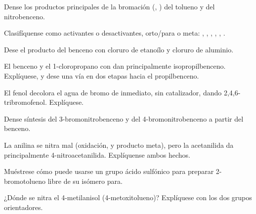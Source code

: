 \begin{exercise}[$\star$]\label{exo:b2:aromatic-substitution:2}
Dense los productos principales de la bromación (, ) del tolueno y del
nitrobenceno.
\end{exercise}

\begin{exercise}[$\star$]\label{exo:b2:aromatic-substitution:3}
Clasifíquense como activantes o desactivantes, orto/para o meta: , , ,
, , .
\end{exercise}

\begin{exercise}[$\star$]\label{exo:b2:aromatic-substitution:4}
Dese el producto del benceno con cloruro de etanoílo y cloruro de aluminio.
\end{exercise}

\begin{exercise}[$\star\star$]\label{exo:b2:aromatic-substitution:5}
El benceno y el 1-cloropropano con  dan principalmente isopropilbenceno. Explíquese, y dese una
vía en dos etapas hacia el propilbenceno.
\end{exercise}

\begin{exercise}[$\star\star$]\label{exo:b2:aromatic-substitution:6}
El fenol decolora el agua de bromo de inmediato, sin catalizador, dando
2,4,6-tribromofenol. Explíquese.
\end{exercise}

\begin{exercise}[$\star\star$]\label{exo:b2:aromatic-substitution:7}
Dense síntesis del 3-bromonitrobenceno y del 4-bromonitrobenceno a partir del benceno.
\end{exercise}

\begin{exercise}[$\star\star$]\label{exo:b2:aromatic-substitution:8}
La anilina se nitra mal (oxidación, y producto meta), pero la acetanilida da principalmente
4-nitroacetanilida. Explíquense ambos hechos.
\end{exercise}

\begin{exercise}[$\star\star$]\label{exo:b2:aromatic-substitution:9}
Muéstrese cómo puede usarse un grupo ácido sulfónico para preparar 2-bromotolueno libre de su isómero para.
\end{exercise}

\begin{exercise}[$\star\star\star$]\label{exo:b2:aromatic-substitution:10}
¿Dónde se nitra el 4-metilanisol (4-metoxitolueno)? Explíquese con los dos
grupos orientadores.
\end{exercise}

